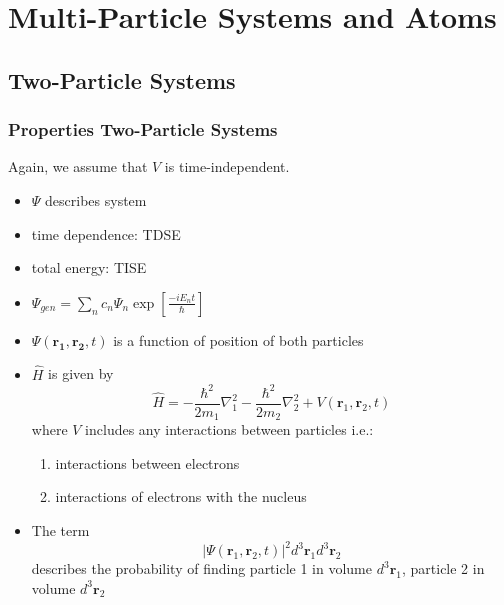 \section{Multi-Particle Systems and Atoms}
\subsection{Two-Particle Systems}
\subsubsection{Properties Two-Particle Systems}
Again, we assume that $V$ is time-independent.

\newpar{}

\begin{itemize}
    \item $\Psi$ describes system
    \item time dependence: TDSE
    \item total energy: TISE
    \item $\Psi_{gen}=\sum_{n} c_{n} \Psi_{n} \exp\left[\frac{-i E_{n} t}{\hbar}\right]$
\end{itemize}

\newpar{}
\begin{itemize}
    \item $\Psi(\mathbf{r_1},\mathbf{r_2},t)$ is a function of position of both particles
    \item $\widehat{H}$ is given by
          \begin{equation*}
              \widehat{H}=-\frac{\hbar^{2}}{2m_{1}}\nabla_{1}^{2}-\frac{\hbar^{2}}{2m_{2}}\nabla_{2}^{2}+V(\mathbf{r}_{1},\mathbf{r}_{2},t)
          \end{equation*}
          where $V$ includes any interactions between particles i.e.:
          \begin{enumerate}
              \item interactions between  electrons
              \item interactions of electrons with the nucleus
          \end{enumerate}
    \item The term
          \begin{equation*}
              |\Psi(\mathbf{r}_{1},\mathbf{r}_{2},t)|^{2} d^{3}\mathbf{r}_{1} d^{3}\mathbf{r}_{2}
          \end{equation*}
          describes the probability of finding particle 1 in volume $d^{3}\mathbf{r}_{1}$, particle 2 in volume $d^{3}\mathbf{r}_{2}$
\end{itemize}

